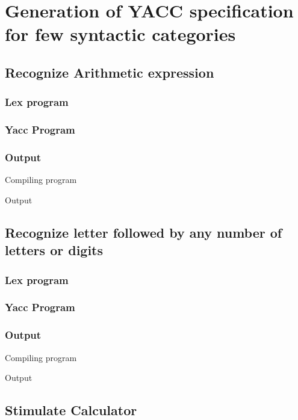 \section{Generation of YACC specification for few syntactic categories}
\subsection{Recognize Arithmetic expression}
\subsubsection{Lex program}

\subsubsection{Yacc Program}

\subsubsection{Output}
Compiling program



\vspace{0.5cm}
Output



\subsection{Recognize letter followed by any number of letters or digits}
\subsubsection{Lex program}

\subsubsection{Yacc Program}

\subsubsection{Output}
Compiling program



\vspace{0.5cm}
Output


\subsection{Stimulate Calculator}
